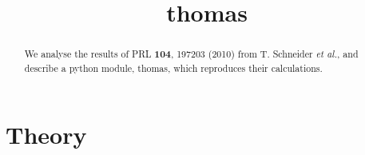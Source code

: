 \documentclass{article}
\title{thomas}
\begin{document}
\maketitle
\begin{abstract}
We analyse the results of PRL \textbf{104}, 197203 (2010) from T. Schneider \textit{et al.}, and describe a python module, thomas, which reproduces their calculations.
\end{abstract}
\section{Theory}
\end{document}
